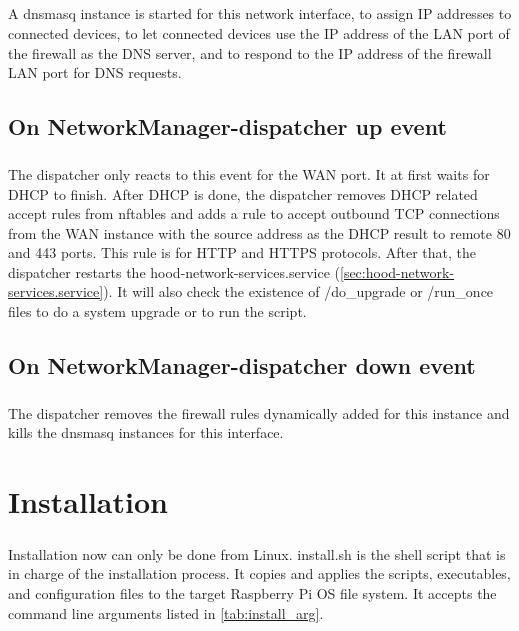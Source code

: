 \documentclass[mscthesis]{usiinfthesis}
\begin{document}
\paragraph{}
A dnsmasq instance is started for this network interface, to assign IP addresses to connected devices, to let connected devices use the IP address of the LAN port of the firewall as the DNS server, and to respond to the IP address of the firewall LAN port for DNS requests.

\section{On NetworkManager-dispatcher up event}
\paragraph{}
The dispatcher only reacts to this event for the WAN port. It at first waits for DHCP to finish. After DHCP is done, the dispatcher removes DHCP related accept rules from nftables and adds a rule to accept outbound TCP connections from the WAN instance with the source address as the DHCP result to remote 80 and 443 ports. This rule is for HTTP and HTTPS protocols. After that, the dispatcher restarts the hood-network-services.service (\cref{sec:hood-network-services.service}). It will also check the existence of /do\_upgrade or /run\_once files to do a system upgrade or to run the script.

\section{On NetworkManager-dispatcher down event}
\paragraph{}
The dispatcher removes the firewall rules dynamically added for this instance and kills the dnsmasq instances for this interface.

\chapter{Installation}\label{cha:install}
\paragraph{}
Installation now can only be done from Linux. install.sh is the shell script that is in charge of the installation process. It copies and applies the scripts, executables, and configuration files to the target Raspberry Pi OS file system. It accepts the command line arguments listed in \cref{tab:install_arg}.
\end{document}
